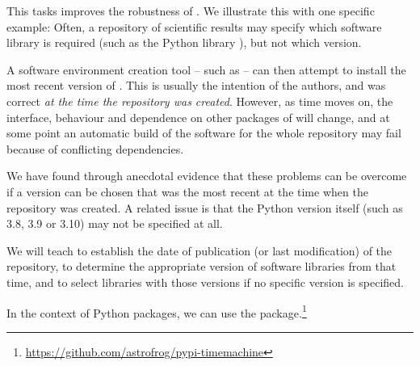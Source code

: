 \begin{task}[
  title=repo2docker development,
  id=repo2docker-timemachine,
  lead=SRL,
  PM=12,
  partners={QS}
]

This tasks improves the robustness of \repotodocker{}. We illustrate this with one specific example: 
Often, a repository of scientific results may
specify which software library is required (such as the Python library
), but not which version.

A software environment creation tool -- such as \repotodocker{} -- can then
attempt to install the most recent version of . This is
usually the intention of the authors, and was correct \emph{at the time the repository
was created}. However, as time moves on, the interface, behaviour and dependence
on other packages of  will change, and at some point an
automatic build of the software for the whole repository may fail because of
conflicting dependencies.

We have found through anecdotal evidence that these problems can be
overcome if a  version can be chosen that was the
most recent at the time when the repository was created. A related
issue is that the Python version itself (such as 3.8, 3.9 or 3.10) may
not be specified at all.

We will teach \repotodocker{} to establish the date of publication
(or last modification) of the repository, to determine the appropriate version
of software libraries from that time, and to select libraries with those
versions if no specific version is specified.

In the context of Python packages, we can use the
package.\footnote{\url{https://github.com/astrofrog/pypi-timemachine}}

\end{task}
